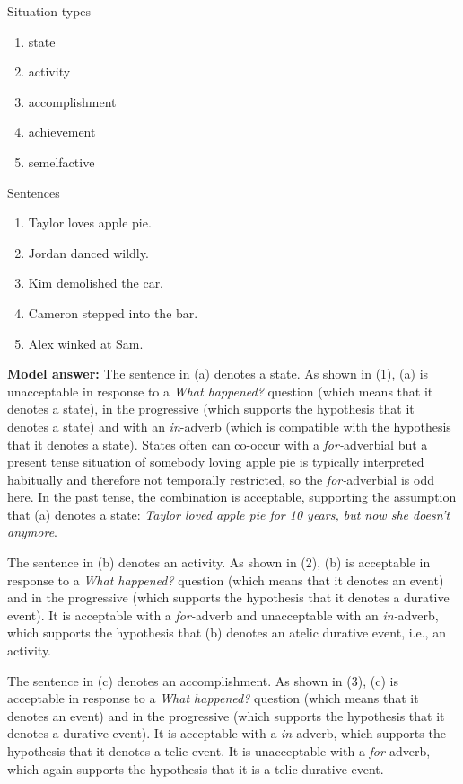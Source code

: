 \documentclass[a4,11pt]{article}
\newcommand{\6}{\mbox{$[\hspace*{-.6mm}[$}}
\newcommand{\9}{\mbox{$]\hspace*{-.6mm}]$}}
\begin{document}
\begin{enumerate}[leftmargin = 12pt]
Situation types

\begin{enumerate}[noitemsep]
\item state
\item activity
\item accomplishment
\item achievement
\item semelfactive
\end{enumerate}

Sentences

\begin{enumerate}[noitemsep]
\item Taylor loves apple pie.
\item Jordan danced wildly.
\item Kim demolished the car.
\item Cameron stepped into the bar.
\item Alex winked at Sam.
\end{enumerate}

{ \bf Model answer:} The sentence in (a) denotes a state. As shown in (1), (a) is unacceptable in response to a {\em What happened?} question (which means that it denotes a state), in the progressive (which supports the hypothesis that it denotes a state) and with an {\em in}-adverb (which is compatible with the hypothesis that it denotes a state). States often can co-occur with a {\em for-}adverbial but a present tense situation of somebody loving apple pie is typically interpreted habitually and therefore not temporally restricted, so the {\em for-}adverbial is odd here. In the past tense, the combination is acceptable, supporting the assumption that (a) denotes a state: {\em Taylor loved apple pie for 10 years, but now she doesn't anymore}.

The sentence in (b) denotes an activity. As shown in (2), (b) is acceptable in response to a {\em What happened?} question (which means that it denotes an event) and in the progressive (which supports the hypothesis that it denotes a durative event). It is acceptable with a {\em for-}adverb and unacceptable with an {\em in-}adverb, which supports the hypothesis that (b) denotes an atelic durative event, i.e., an activity. 

The sentence in (c) denotes an accomplishment. As shown in (3), (c) is acceptable in response to a {\em What happened?} question (which means that it denotes an event) and in the progressive (which supports the hypothesis that it denotes a durative event). It is acceptable with a {\em in-}adverb, which supports the hypothesis that it denotes a telic event. It is unacceptable with a {\em for-}adverb, which again supports the hypothesis that it is a telic durative event.


\end{enumerate}
\end{document}
